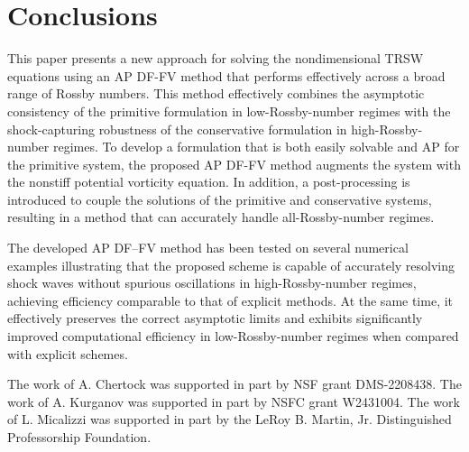 \documentclass[a4paper,11pt,twoside]{article}
\newenvironment{acknowledgment}{{\flushleft \bf Acknowledgment:}}{}
\numberwithin{equation}{section}
\numberwithin{figure}{section}
\numberwithin{table}{section}
\begin{document}
\section{Conclusions}\label{sec6}	 
This paper presents a new approach for solving the nondimensional TRSW equations using an AP DF-FV method that performs effectively across a
broad range of Rossby numbers. This method effectively combines the asymptotic consistency of the primitive formulation in low-Rossby-number
regimes with the shock-capturing robustness of the conservative formulation in high-Rossby-number regimes. To develop a formulation that is
both easily solvable and AP for the primitive system, the proposed AP DF-FV method augments the system with the nonstiff potential vorticity
equation. In addition, a post-processing is introduced to couple the solutions of the primitive and conservative systems, resulting in a
method that can accurately handle all-Rossby-number regimes.

The developed AP DF–FV method has been tested on several numerical examples illustrating that the proposed scheme is capable of accurately
resolving shock waves without spurious oscillations in high-Rossby-number regimes, achieving efficiency comparable to that of explicit
methods. At the same time, it effectively preserves the correct asymptotic limits and exhibits significantly improved computational
efficiency in low-Rossby-number regimes when compared with explicit schemes.

\begin{acknowledgment}
The work of A. Chertock was supported in part by NSF grant DMS-2208438. The work of A. Kurganov was supported in part by NSFC grant
W2431004. The work of L. Micalizzi was supported in part by the LeRoy B. Martin, Jr. Distinguished Professorship Foundation.
\end{acknowledgment}
	


	
\end{document}
